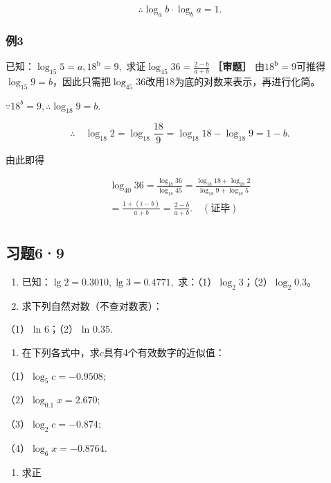 \[
\therefore \log_{a} b \cdot \log_{b} a = 1.
\]

\subsubsection{例3}

已知：\(\log_{15}5 = a, 18^{\mathrm{b}} = 9,\)
求证\(\log_{45}36 = \frac{2 - b}{a + b}\) \textbf{［审题］}
由\(18^{\mathrm{b}} = 9\)可推得\(\log_{15}9 = b\)，因此只需把\(\log_{45}36\)改用18为底的对数来表示，再进行化简。

 \(\because 18^{b} = 9, \therefore \log_{18}9 = b.\)

\[
\therefore \quad \log_{18} 2 = \log_{18} \frac{18}{9} = \log_{18} 18 - \log_{18} 9 = 1 - b.
\]

由此即得

\[
\begin{array}{l} \log_{40} 36 = \frac{\log_{18} 36}{\log_{18} 45} = \frac{\log_{18} 18 + \log_{18} 2}{\log_{18} 9 + \log_{18} 5} \\ = \frac{1 + (i - b)}{a + b} = \frac{2 - b}{a + b}. \quad (\text{证毕}) \\ \end{array}
\]

\subsection{习题6·9}

\begin{enumerate}
\item
  已知：\(\lg 2=0.3010,\lg 3=0.4771,\)
  求：（1）\(\log_{2}3\)；（2）\(\log_{2}0.3\)。
\item
  求下列自然对数（不查对数表）：
\end{enumerate}

（1） ln 6；（2） ln 0.35.

\begin{enumerate}[start=3]
\item
  在下列各式中，求\(c\)具有4个有效数字的近似值：
\end{enumerate}

（1）\(\log_{5}c = -0.9508;\)

（2）\(\log_{0.1}x = 2.670;\)

（3）\(\log_{2}c = -0.874;\)

（4）\(\log_{6}x = -0.8764.\)

\begin{enumerate}[start=4]
\item
  求正
\end{enumerate}

